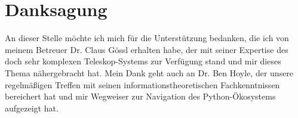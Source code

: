 

\chapter*{Danksagung}
An dieser Stelle möchte ich mich für die Unterstützung bedanken, die ich von meinem Betreuer Dr. Claus Gössl erhalten habe, der mit seiner Expertise des doch sehr komplexen Teleskop-Systems zur Verfügung stand und mir dieses Thema nähergebracht hat. Mein Dank geht auch an Dr. Ben Hoyle, der unsere regelmäßigen Treffen mit seinen informationstheoretischen Fachkenntnissen bereichert hat und mir Wegweiser zur Navigation des Python-Ökosystems aufgezeigt hat.